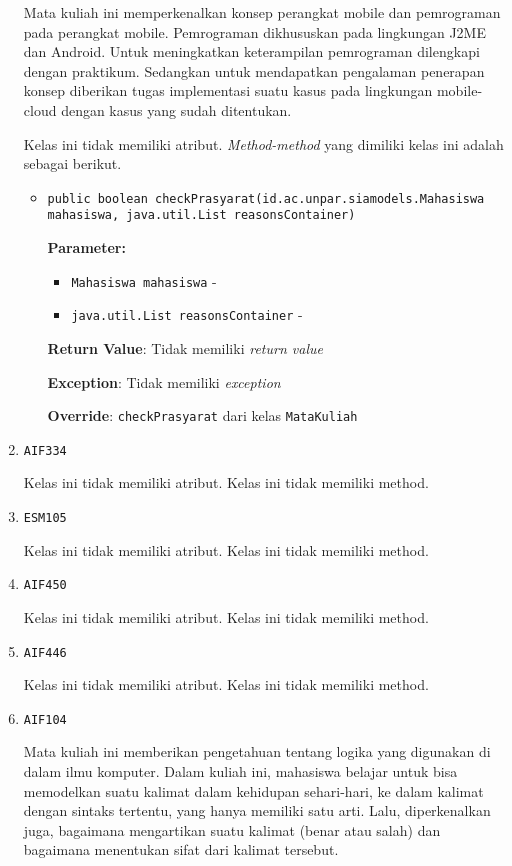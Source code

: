 \documentclass{article}
\begin{document}
\begin{enumerate}
Mata kuliah ini memperkenalkan konsep perangkat mobile dan pemrograman pada perangkat 
 mobile. Pemrograman dikhususkan pada lingkungan J2ME dan Android.
 Untuk meningkatkan keterampilan pemrograman dilengkapi dengan praktikum. 
 Sedangkan untuk mendapatkan pengalaman penerapan konsep diberikan tugas implementasi suatu 
 kasus pada lingkungan mobile-cloud dengan kasus yang sudah ditentukan.

Kelas ini tidak memiliki atribut. \textit{Method-method} yang dimiliki kelas ini adalah sebagai berikut.
\begin{itemize}
\item \texttt{public boolean checkPrasyarat(id.ac.unpar.siamodels.Mahasiswa mahasiswa, java.util.List reasonsContainer)}

\textbf{Parameter:}
\begin{itemize}
\item \texttt{Mahasiswa mahasiswa} - 
\item \texttt{java.util.List reasonsContainer} - 
\end{itemize}
\textbf{Return Value}: Tidak memiliki \textit{return value}

\textbf{Exception}: Tidak memiliki \textit{exception}

\textbf{Override}: \texttt{checkPrasyarat} dari kelas \texttt{MataKuliah}

\end{itemize}
\item \texttt{AIF334}



Kelas ini tidak memiliki atribut. Kelas ini tidak memiliki method. \item \texttt{ESM105}



Kelas ini tidak memiliki atribut. Kelas ini tidak memiliki method. \item \texttt{AIF450}



Kelas ini tidak memiliki atribut. Kelas ini tidak memiliki method. \item \texttt{AIF446}



Kelas ini tidak memiliki atribut. Kelas ini tidak memiliki method. \item \texttt{AIF104}

Mata kuliah ini memberikan pengetahuan tentang logika yang digunakan di 
 dalam ilmu komputer. Dalam kuliah ini, mahasiswa belajar untuk bisa 
 memodelkan suatu kalimat dalam kehidupan sehari-hari, ke dalam kalimat 
 dengan sintaks tertentu, yang hanya memiliki satu arti. Lalu, diperkenalkan 
 juga, bagaimana mengartikan suatu kalimat (benar atau salah) dan bagaimana 
 menentukan sifat dari kalimat tersebut.


\end{enumerate}
\end{document}
